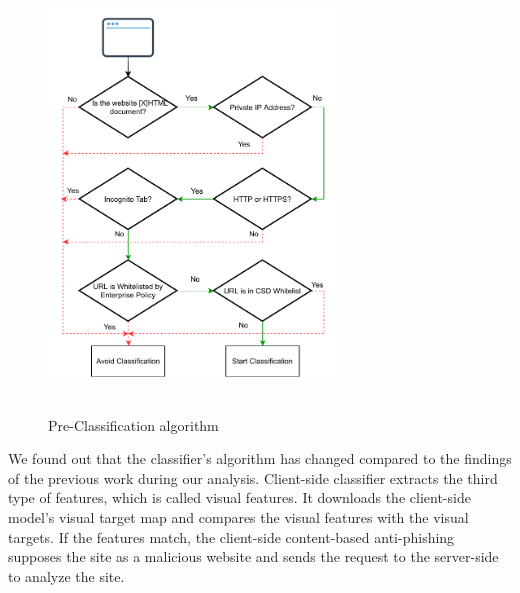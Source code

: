 \begin{enumerate}
\begin{figure}[!h]
\centering
\includegraphics[height=4.5in, width=3in]{figures/preclassificationdiagram-3.pdf}
\caption{Pre-Classification algorithm}
\label{fig:Pre-classification}
\end{figure} 
We found out that the classifier's algorithm has changed compared to the findings of the previous work during our analysis.
Client-side classifier extracts the third type of features, which is called visual features.  It downloads the client-side model's visual target map and compares the visual features with the visual targets. If the features match, the client-side content-based anti-phishing supposes the site as a malicious website and sends the request to the server-side to analyze the site.
\end{enumerate}

